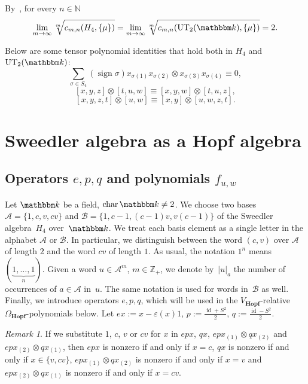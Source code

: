 \documentclass[12pt, reqno, a4paper]{amsart}
\theoremstyle{plain}
\theoremstyle{remark}
\newtheorem{remark}[theorem]{Remark}
\theoremstyle{definition}
\numberwithin{equation}{section}
\DeclareMathOperator{\id}{id}
\DeclareMathOperator{\ch}{char}
\DeclareMathOperator{\sign}{sign}
\begin{document}
By~\cite[Corollary~7.4]{Novochadov}, for every $n\in\mathbb N$
$$\lim\limits_{m\to\infty} \sqrt[m]{c_{m,n}(H_4,\lbrace \mu \rbrace)}
= \lim\limits_{m\to\infty} \sqrt[m]{c_{m,n}(\mathrm{UT}_2(\mathbbm k),\lbrace \mu \rbrace)} = 2.$$

Below are some tensor polynomial identities that hold both in $H_4$ and $\mathrm{UT}_2(\mathbbm k)$:
$$\sum\limits_{\sigma\in S_4} (\sign \sigma) x_{\sigma(1)} x_{\sigma(2)} \otimes x_{\sigma(3)}x_{\sigma(4)}\equiv 0,$$
$$[x,y,z]\otimes [t,u,w]\equiv [x,y,w]\otimes [t,u,z],$$
$$[x,y,z,t]\otimes [u,w]\equiv [x,y]\otimes [u,w,z,t].$$



\section{Sweedler algebra as a Hopf algebra}\label{SectionSweedlerAsAHopfAlgebra}

\subsection{Operators $e,p,q$ and polynomials $f_{u,w}$}\label{SubsectionOperatorsEPQandMonomialsFUW}

 Let $\mathbbm k$ be a field, $\ch \mathbbm k \ne 2$. We choose 
 two bases $\mathcal A = \lbrace 1, c, v, cv\rbrace$ and $\mathcal B =\lbrace 1, c-1, (c-1)v, v(c-1)\rbrace$
 of the Sweedler algebra~$H_4$ over~$\mathbbm k$. We treat each basis element as a single letter
 in the alphabet $\mathcal A$ or $\mathcal B$. In particular, we distinguish between
 the word $(c,v)$ over $\mathcal A$ of length $2$ and the word $cv$ of length $1$.  As usual, the notation $1^n$ means
 $(\underbrace{1,\ldots, 1}_n)$.
 Given a word $u \in \mathcal A^m$, $m\in \mathbb Z_+$, we denote by~$|u|_a$ the number of occurrences of $a\in \mathcal A$
 in~$u$. The same notation is used for words in~$\mathcal B$ as well.
 Finally, we introduce operators $e,p,q$, which will be used in the $V_{\mathbf{Hopf}}$-relative $\Omega_\mathbf{Hopf}$-polynomials below. Let $e x := x-\varepsilon(x)1$, $p := \frac{\id +S^2}{2}$, $q := \frac{\id -S^2}{2}$.
 
 \begin{remark}\label{RemarkSweedlerOperatorsEPQ}
 		 If we substitute $1$, $c$, $v$ or $cv$
 	for $x$ in $epx$, $qx$, $epx_{(1)}\otimes qx_{(2)}$ and $epx_{(2)}\otimes qx_{(1)}$,
 	then $epx$ is nonzero if and only if $x=c$, $qx$ is nonzero if and only if $x \in \lbrace v, cv\rbrace$,
 	$epx_{(1)}\otimes qx_{(2)}$ is nonzero if and only if $x=v$  and $epx_{(2)}\otimes qx_{(1)}$
 	is nonzero if and only if $x=cv$.
 \end{remark}
 
\end{document}
